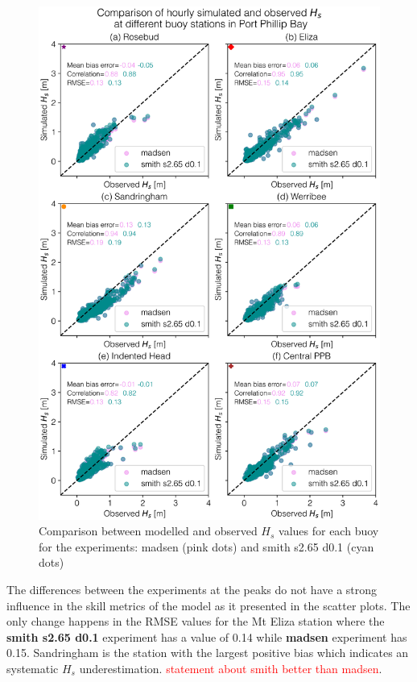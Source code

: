 \documentclass[12pt]{article}
\begin{document}
\begin{figure}[H]
    \centering
    \includegraphics[scale=0.7]{plots/scatter/madsen_vs_smith s2.65 d0.1_vert_sca.png}
    \caption{Comparison between modelled and observed $H_{s}$ values for each buoy for the experiments: madsen (pink dots) and smith s2.65 d0.1 (cyan dots) }
    \label{fig:scatter_madsen_vs_smith_def}
\end{figure}

The differences between the experiments at the peaks do not have a strong influence in the skill metrics of the model as it presented in the scatter plots. The only change happens in the RMSE values for the Mt Eliza station where the \textbf{smith s2.65 d0.1} experiment has a value of 0.14 while \textbf{madsen} experiment has 0.15. Sandringham is the station with the largest positive bias which indicates an systematic $H_s$ underestimation. \textcolor{red}{statement about smith better than madsen}.\\
\end{document}
